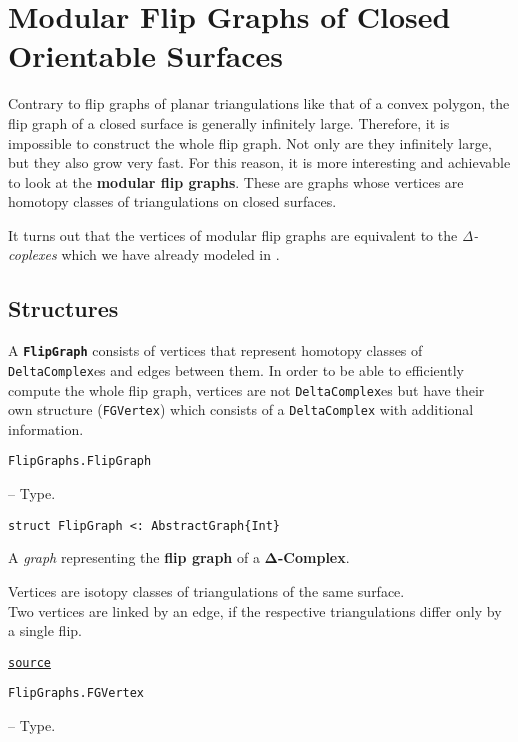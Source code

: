\chapter{Modular Flip Graphs of Closed Orientable Surfaces}



\label{691037665121027587}{}




Contrary to flip graphs of planar triangulations like that of a convex polygon, the flip graph of a closed surface is generally infinitely large. Therefore, it is impossible to construct the whole flip graph. Not only are they infinitely large, but they also {\textquotedbl}grow{\textquotedbl} very fast. For this reason, it is more interesting and achievable to look at the \textbf{modular flip graphs}. These are graphs whose vertices are homotopy classes of triangulations on closed surfaces.



It turns out that the vertices of modular flip graphs are equivalent to the \emph{Δ-coplexes} which we have already modeled in .



\section{Structures}



\label{15035490444877811912}{}


A \textbf{\texttt{FlipGraph}} consists of vertices that represent homotopy classes of \texttt{DeltaComplex}es and edges between them.  In order to be able to efficiently compute the whole flip graph, vertices are not \texttt{DeltaComplex}es but have their own structure (\texttt{FGVertex}) which consists of a \texttt{DeltaComplex} with additional information.


\hypertarget{14918097106326738732}{\texttt{FlipGraphs.FlipGraph}}  -- {Type.}

\begin{adjustwidth}{2em}{0pt}


\begin{verbatim}
struct FlipGraph <: AbstractGraph{Int}
\end{verbatim}

A \emph{graph} representing the \textbf{flip graph} of a \textbf{Δ-Complex}.

Vertices are isotopy classes of triangulations of the same surface.\\
Two vertices are linked by an edge, if the respective triangulations differ only by a single flip.



\href{https://github.com/schto223/FlipGraphs.jl/blob/490c01a7adf74b42f27dda05099165c47ae8133e/src/flipGraph.jl#L151-L158}{\texttt{source}}


\end{adjustwidth}
\hypertarget{120589140144457623}{\texttt{FlipGraphs.FGVertex}}  -- {Type.}

